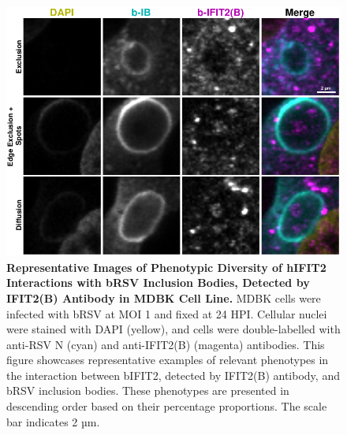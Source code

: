 \begin{figure}
    \centering
    \includegraphics[width=1\linewidth]{08. Chapter 3/Figs/02. Infection/02. IFIT2/02. IFIT2B/12. i2b mdbk brsv.pdf} 
    \caption[Representative Images of Phenotypic Diversity of hIFIT2 Interactions with bRSV Inclusion Bodies, Detected by IFIT2(B) Antibody in MDBK Cell Line.]{\textbf{Representative Images of Phenotypic Diversity of hIFIT2 Interactions with bRSV Inclusion Bodies, Detected by IFIT2(B) Antibody in MDBK Cell Line.} MDBK cells were infected with bRSV at MOI 1 and fixed at 24 HPI. Cellular nuclei were stained with DAPI (yellow), and cells were double-labelled with anti-RSV N (cyan) and anti-IFIT2(B) (magenta) antibodies. This figure showcases representative examples of relevant phenotypes in the interaction between bIFIT2, detected by IFIT2(B) antibody, and bRSV inclusion bodies. These phenotypes are presented in descending order based on their percentage proportions. The scale bar indicates 2 µm.}
    \label{fig:Representative Images of Phenotypic Diversity of hIFIT2 Interactions with bRSV Inclusion Bodies, Detected by IFIT2(B) Antibody in MDBK Cell Line}
\end{figure}

